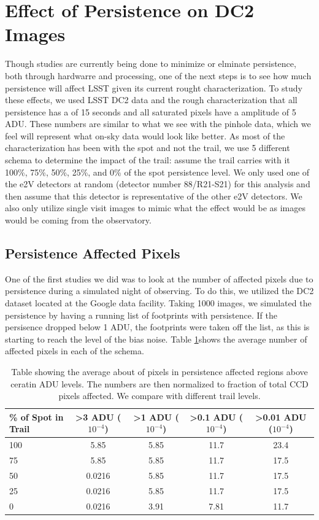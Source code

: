 \documentclass[DM,authoryear,toc]{lsstdoc}
\begin{document}
\section{Effect of Persistence on DC2 Images}

Though studies are currently being done to minimize or elminate persistence, both through hardwarre and processing, one of the next steps is to see how much persistence will affect LSST given its current rought characterization.
To study these effects, we used LSST DC2 data and the rough characterization that all persistence has a \textit{\tau} of 15 seconds and all saturated pixels have a amplitude of 5 ADU\@.
These numbers are similar to what we see with the pinhole data, which we feel will represent what on-sky data would look like better.
As most of the characterization has been with the spot and not the trail, we use 5 different schema to determine the impact of the trail: assume the trail carries with it 100\%, 75\%, 50\%, 25\%, and 0\% of the spot persistence level.
We only used one of the e2V detectors at random (detector number 88/R21-S21) for this analysis and then assume that this detector is representative of the other e2V detectors.
We also only utilize single visit images to mimic what the effect would be as images would be coming from the observatory.

\subsection{Persistence Affected Pixels}

One of the first studies we did was to look at the number of affected pixels due to persistence during a simulated night of observing.
To do this, we utilized the DC2 dataset located at the Google data facility.
Taking 1000 images, we simulated the persistence by having a running list of footprints with persistence.
If the persisence dropped below 1 ADU, the footprints were taken off the list, as this is starting to reach the level of the bias noise.
Table \ref{tab:persis_affected}shows the average number of affected pixels in each of the schema.

\begin{table}[h!]
\centering
\begin{tabular}{|lcccc|}
\hline
\% of Spot in Trail & >3 ADU ($10^{-4}$) & >1 ADU ($10^{-4}$) & >0.1 ADU ($10^{-4}$) & >0.01 ADU ($10^{-4}$) \\
\hline
100 & 5.85 & 5.85 & 11.7 & 23.4 \\
75 & 5.85 & 5.85 & 11.7 & 17.5 \\
50 & 0.0216 & 5.85 & 11.7 & 17.5 \\
25 & 0.0216 & 5.85 & 11.7 & 17.5 \\
0 & 0.0216 & 3.91 & 7.81 & 11.7 \\
\hline
\end{tabular}\label{tab:persis_affected}
\caption{Table showing the average about of pixels in persistence affected regions above ceratin ADU levels. 
The numbers are then normalized to fraction of total CCD pixels affected.
We compare with different trail levels.
}  
\end{table}
\end{document}
